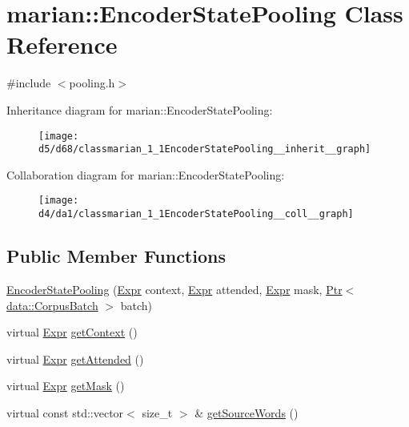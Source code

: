 \hypertarget{classmarian_1_1EncoderStatePooling}{}\section{marian\+:\+:Encoder\+State\+Pooling Class Reference}
\label{classmarian_1_1EncoderStatePooling}


{\ttfamily \#include $<$pooling.\+h$>$}



Inheritance diagram for marian\+:\+:Encoder\+State\+Pooling\+:
\nopagebreak
\begin{figure}[H]
\begin{center}
\leavevmode
\texttt{[image: d5/d68/classmarian\_1\_1EncoderStatePooling\_\_inherit\_\_graph]}
\end{center}
\end{figure}


Collaboration diagram for marian\+:\+:Encoder\+State\+Pooling\+:
\nopagebreak
\begin{figure}[H]
\begin{center}
\leavevmode
\texttt{[image: d4/da1/classmarian\_1\_1EncoderStatePooling\_\_coll\_\_graph]}
\end{center}
\end{figure}
\subsection*{Public Member Functions}
\begin{DoxyCompactItemize}
\item 
\hyperlink{classmarian_1_1EncoderStatePooling_a657d3789fda3f2f80e7163087f584cf9}{Encoder\+State\+Pooling} (\hyperlink{namespacemarian_a498d8baf75b754011078b890b39c8e12}{Expr} context, \hyperlink{namespacemarian_a498d8baf75b754011078b890b39c8e12}{Expr} attended, \hyperlink{namespacemarian_a498d8baf75b754011078b890b39c8e12}{Expr} mask, \hyperlink{namespacemarian_ad1a373be43a00ef9ce35666145137b08}{Ptr}$<$ \hyperlink{classmarian_1_1data_1_1CorpusBatch}{data\+::\+Corpus\+Batch} $>$ batch)
\item 
virtual \hyperlink{namespacemarian_a498d8baf75b754011078b890b39c8e12}{Expr} \hyperlink{classmarian_1_1EncoderStatePooling_ab870704b9a38d6917a1e8b365978e36e}{get\+Context} ()
\item 
virtual \hyperlink{namespacemarian_a498d8baf75b754011078b890b39c8e12}{Expr} \hyperlink{classmarian_1_1EncoderStatePooling_aac79a7a0a281bd88b50cafd278802a22}{get\+Attended} ()
\item 
virtual \hyperlink{namespacemarian_a498d8baf75b754011078b890b39c8e12}{Expr} \hyperlink{classmarian_1_1EncoderStatePooling_ace601efa11aebfbd545a094d1fb222e9}{get\+Mask} ()
\item 
virtual const std\+::vector$<$ size\+\_\+t $>$ \& \hyperlink{classmarian_1_1EncoderStatePooling_abf81ac7384016df3846fb56d12c0ec05}{get\+Source\+Words} ()
\end{DoxyCompactItemize}
